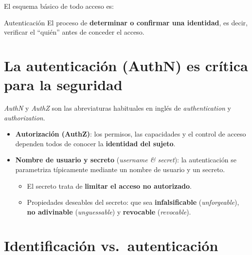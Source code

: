 \documentclass[11pt,a4paper]{report}
\begin{document}
El esquema básico de todo acceso es:
 
\begin{center}
\end{center}
 
\begin{definicion}{Autenticación}
El proceso de \textbf{determinar o confirmar una identidad}, es decir, verificar el ``quién'' antes de conceder el acceso.
\end{definicion}
 
\section{La autenticación (AuthN) es crítica para la seguridad}
 
\emph{AuthN} y \emph{AuthZ} son las abreviaturas habituales en inglés de \emph{authentication} y \emph{authorization}.
 
\begin{itemize}
  \item \textbf{Autorización (AuthZ)}: los permisos, las capacidades y el control de acceso dependen todos de conocer la \textbf{identidad del sujeto}.
  \item \textbf{Nombre de usuario y secreto} (\emph{username \& secret}): la autenticación se parametriza típicamente mediante un nombre de usuario y un secreto.
    \begin{itemize}
      \item El secreto trata de \textbf{limitar el acceso no autorizado}.
      \item Propiedades deseables del secreto: que sea \textbf{infalsificable} (\emph{unforgeable}), \textbf{no adivinable} (\emph{unguessable}) y \textbf{revocable} (\emph{revocable}).
    \end{itemize}
\end{itemize}
 
\section{Identificación vs.\ autenticación}
 
\end{document}

